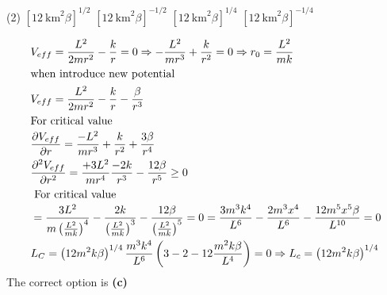 \begin{enumerate}
\begin{tasks}(2)
	\task[\textbf{A.}] $\left[12 \mathrm{~km}^{2} \beta\right]^{1 / 2}$
	\task[\textbf{B.}]$\left[12 \mathrm{~km}^{2} \beta\right]^{-1 / 2}$
	\task[\textbf{C.}]$\left[12 \mathrm{~km}^{2} \beta\right]^{1 / 4}$
	\task[\textbf{D.}]$\left[12 \mathrm{~km}^{2} \beta\right]^{-1 / 4}$
\end{tasks}
\begin{answer}
	\begin{align*}
		&V_{e f f}=\frac{L^{2}}{2 m r^{2}}-\frac{k}{r}=0 \Rightarrow-\frac{L^{2}}{m r^{3}}+\frac{k}{r^{2}}=0 \Rightarrow r_{0}=\frac{L^{2}}{m k}\\
	\intertext{when introduce new potential}
	&V_{e f f}=\frac{L^{2}}{2 m r^{2}}-\frac{k}{r}-\frac{\beta}{r^{3}}
	\\
	\intertext{For critical value}
	&\frac{\partial V_{e f f}}{\partial r}=\frac{-L^{2}}{m r^{3}}+\frac{k}{r^{2}}+\frac{3 \beta}{r^{4}} \\
	&\frac{\partial^{2} V_{e f f}}{\partial r^{2}}=\frac{+3 L^{2}}{m r^{4}} \frac{-2 k}{r^{3}}-\frac{12 \beta}{r^{5}} \geq 0\\
	\intertext{ For critical value }
	&=\frac{3 L^{2}}{m\left(\frac{L^{2}}{m k}\right)^{4}}-\frac{2 k}{\left(\frac{L^{2}}{m k}\right)^{3}}-\frac{12 \beta}{\left(\frac{L^{2}}{m k}\right)^{5}}=0=\frac{3 m^{3} k^{4}}{L^{6}}-\frac{2 m^{3} x^{4}}{L^{6}}-\frac{12 m^{5} x^{5} \beta}{L^{10}}=0 \\
	&L_{C}=\left(12 m^{2} k \beta\right)^{1 / 4} \frac{m^{3} k^{4}}{L^{6}}\left(3-2-12 \frac{m^{2} k \beta}{L^{4}}\right)=0 \Rightarrow L_{c}=\left(12 m^{2} k \beta\right)^{1 / 4}
	\end{align*}
	The correct option is \textbf{(c)}
\end{answer}
\end{enumerate}


